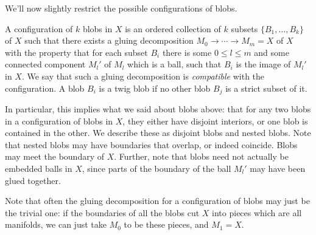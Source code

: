We'll now slightly restrict the possible configurations of blobs.
\begin{defn}
\label{defn:configuration}
A configuration of $k$ blobs in $X$ is an ordered collection of $k$ subsets $\{B_1, \ldots, B_k\}$ 
of $X$ such that there exists a gluing decomposition $M_0  \to \cdots \to M_m = X$ of $X$ 
with the property that 
for each subset $B_i$ there is some $0 \leq l \leq m$ and some connected component $M_l'$ of 
$M_l$ which is a ball, such that $B_i$ is the image of $M_l'$ in $X$. 
We say that such a gluing decomposition 
is \emph{compatible} with the configuration. 
A blob $B_i$ is a twig blob if no other blob $B_j$ is a strict subset of it. 
\end{defn}
In particular, this implies what we said about blobs above: 
that for any two blobs in a configuration of blobs in $X$, 
they either have disjoint interiors, or one blob is contained in the other. 
We describe these as disjoint blobs and nested blobs. 
Note that nested blobs may have boundaries that overlap, or indeed coincide. 
Blobs may meet the boundary of $X$.
Further, note that blobs need not actually be embedded balls in $X$, since parts of the 
boundary of the ball $M_l'$ may have been glued together.

Note that often the gluing decomposition for a configuration of blobs may just be the trivial one: 
if the boundaries of all the blobs cut $X$ into pieces which are all manifolds, 
we can just take $M_0$ to be these pieces, and $M_1 = X$.

